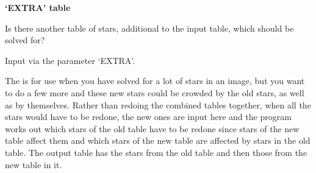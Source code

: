 \begin{small}
{{ {\bf \hspace*{1em} `EXTRA' table}

   Is there another table of stars, additional to the input table,
   which should be solved for?

   Input via the parameter `EXTRA'.

   The is for use when you have solved for a lot of stars in an image,
   but you want to do a few more and these new stars could be crowded
   by the old stars, as well as by themselves. Rather than redoing the
   combined tables together, when all the stars would have to be
   redone, the new ones are input here and the program works out which
   stars of the old table have to be redone since stars of the new
   table affect them and which stars of the new table are affected by
   stars in the old table. The output table has the stars from the old
   table and then those from the new table in it.

}}
\end{small}
